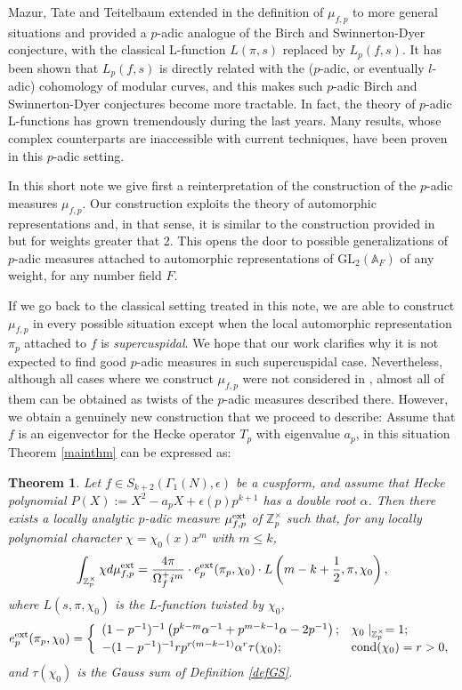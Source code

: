 \documentclass{amsart}
\newtheorem{thm0}[defn0]{Theorem}
\newenvironment{theorem}{\begin{thm0}}{\end{thm0}}
\newcommand{\GL}{{\mathrm{GL}}}
\newcommand{\Z}{{\mathbb Z}}
\newcommand{\A}{{\mathbb A}}
\begin{document}
Mazur, Tate and Teitelbaum extended in \cite{MTT86} the definition of $\mu_{f,p}$ to more general situations and provided a $p$-adic analogue of the Birch and Swinnerton-Dyer conjecture, with the classical L-function $L(\pi,s)$ replaced by $L_p(f,s)$.
It has been shown that $L_p(f,s)$ is directly related with the ($p$-adic, or eventually $l$-adic) cohomology of modular curves, and this makes such $p$-adic Birch and Swinnerton-Dyer conjectures become more tractable. 
In fact, the theory of $p$-adic L-functions has grown tremendously during the last years. Many results, whose complex counterparts are inaccessible with current techniques, have been proven in this $p$-adic setting. 


In this short note we give first a reinterpretation of the construction of the $p$-adic measures $\mu_{f,p}$. Our construction exploits the theory of automorphic representations and, in that sense, it is similar to the construction provided in \cite{Spi14} but for weights greater that 2. This opens the door to possible generalizations of $p$-adic measures attached to automorphic representations of $\GL_2(\A_F)$ of any weight, for any number field $F$.

If we go back to the classical setting treated in this note, we are able to construct $\mu_{f,p}$ in every possible situation except when the local automorphic representation $\pi_p$ attached to $f$ is \emph{supercuspidal}.
We hope that our work clarifies why it is not expected to find good $p$-adic measures in such supercuspidal case. 
Nevertheless, although all cases where we construct $\mu_{f,p}$ were not considered in \cite{MTT86}, almost all of them can be obtained as twists of the $p$-adic measures described there.
However, we obtain a genuinely new construction that we proceed to describe: Assume that $f$ is an eigenvector for the Hecke operator $T_p$ with eigenvalue $a_p$, in this situation Theorem \ref{mainthm} can be expressed as:
\begin{theorem}
Let $f\in S_{k+2}(\Gamma_1(N),\epsilon)$ be a cuspform, and assume that Hecke polynomial $P(X):=X^2-a_pX+\epsilon(p)p^{k+1}$ has a double root $\alpha$. Then there exists a locally analytic $p$-adic measure $\mu_{f,p}^{\rm ext}$ of $\Z_p^\times$ such that, for any locally polynomial character $\chi=\chi_0(x)x^m$ with $m\leq k$,
\begin{equation}\label{IntForInt}
\int_{\Z_p^\times}\chi d\mu_{f,p}^{\rm ext}=\frac{4\pi }{\Omega_f^+i^m}\cdot e_p^{\rm ext}(\pi_p,\chi_0)\cdot L\left(m-k+\frac{1}{2},\pi,\chi_0\right),
\end{equation}
where $L\left(s,\pi,\chi_0\right)$ is the L-function twisted by $\chi_0$, 
\[
e_p^{\rm ext}(\pi_p,\chi_0)=\left\{\begin{array}{ll}
(1-p^{-1})^{-1}\left(p^{k-m}\alpha^{-1}+p^{m-k-1}\alpha-2p^{-1}\right);&\chi_0\mid_{\Z_p^\times}=1;\\
-(1-p^{-1})^{-1}rp^{r(m-k-1)}\alpha^{r}\tau(\chi_0);&{\rm cond}(\chi_0)=r>0,
\end{array}\right.
\]
and $\tau(\chi_0)$ is the Gauss sum of Definition \ref{defGS}.
\end{theorem}
\end{document}
